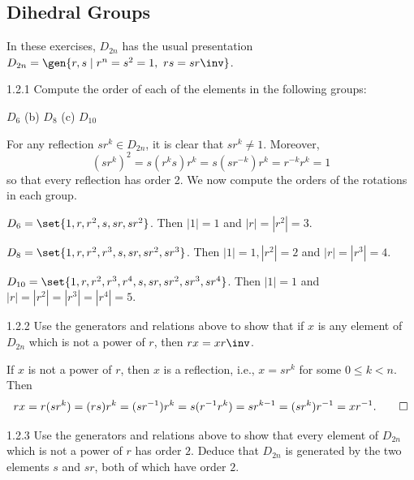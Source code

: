 \subsection{Dihedral Groups}

In these exercises, $D_{2n}$ has the usual presentation 
$D_{2n} = \gen{r, s \mid r^n = s^2 = 1, \ rs = sr\inv}$.

\begin{exercise}{1.2.1}
    Compute the order of each of the elements in the following groups:
    \begin{subexercises}
        \item $D_6$ \quad (b) $D_8$ \quad (c) $D_{10}$
    \end{subexercises}
\end{exercise}

\begin{sol}
    For any reflection $sr^k \in D_{2n}$, it is clear that $sr^k \neq 1$.
	Moreover,
    \[
    	(sr^k)^2 = s(r^ks)r^k = s(sr^{-k})r^k = r^{-k}r^k = 1
    \]
    so that every reflection has order 2.
	We now compute the orders of the rotations in each group.
    \begin{subexercises}
        \item $D_6 = \set{1, r, r^2, s, sr, sr^2}$.
	    Then $|1| = 1$ and $|r| = |r^2| = 3$.
        \item $D_8 = \set{1, r, r^2, r^3, s, sr, sr^2, sr^3}$.
	    Then $|1| = 1, |r^2| = 2$ and $|r| = |r^3| = 4$.
        \item $D_{10} = \set{1, r, r^2, r^3, r^4, s, sr, sr^2, sr^3, sr^4}$.
	    Then $|1| = 1$ and $|r| = |r^2| = |r^3| = |r^4| = 5$. \qedhere
    \end{subexercises}
\end{sol}

\begin{exercise}{1.2.2}
    Use the generators and relations above to show that if $x$ is any element of $D_{2n}$ which is not a power of $r$, then $rx = xr\inv$.
\end{exercise}

\begin{sol}
    If $x$ is not a power of $r$, then $x$ is a reflection, i.e., $x = sr^k$ for some $0 \leq k < n$.
	Then
    \[
    	rx = r(sr^k) = (rs)r^k = (sr^{-1})r^k = s(r^{-1}r^k) = s r^{k - 1} = (sr^k) r^{-1} = x r^{-1}. \qedhere
    \]
\end{sol}

\begin{exercise}{1.2.3}
    Use the generators and relations above to show that every element of $D_{2n}$ which is not a power of $r$ has order $2$.
	Deduce that $D_{2n}$ is generated by the two elements $s$ and $sr$, both of which have order $2$.

\end{exercise}
 
